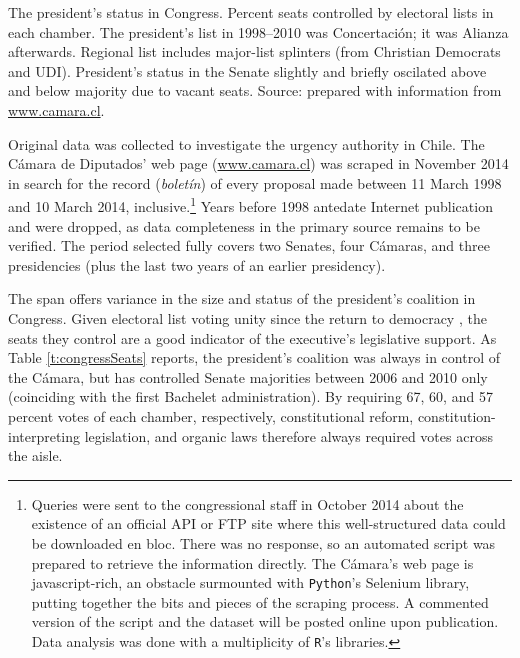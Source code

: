 \documentclass[letter,12pt]{article}
\newcommand{\mc}{\multicolumn}
\begin{document}
\begin{table}
\begin{center}
\caption{The president's status in Congress. Percent seats controlled by electoral lists in each chamber. The president's list in 1998--2010 was Concertaci\'on; it was Alianza afterwards. Regional list includes major-list splinters (from Christian Democrats and UDI). President's status in the Senate slightly and briefly oscilated above and below majority due to vacant seats. Source: prepared with information from \protect\url{www.camara.cl}.}\label{t:congressSeats}
\end{center}
\end{table}

Original data was collected to investigate the urgency authority in Chile. The C\'amara de Diputados' web page (\url{www.camara.cl}) was scraped in November 2014 in search for the record (\emph{bolet\'in}) of every proposal made between 11 March 1998 and 10 March 2014, inclusive.\footnote{Queries were sent to the congressional staff in October 2014 about the existence of an official API or FTP site where this well-structured data could be downloaded en bloc. There was no response, so an automated script was prepared to retrieve the information directly. The C\'amara's web page is javascript-rich, an obstacle surmounted with \texttt{Python}'s Selenium library, putting together the bits and pieces of the scraping process. A commented version of the script and the dataset will be posted online upon publication. Data analysis was done with a multiplicity of \texttt{R}'s libraries.} Years before 1998 antedate Internet publication and were dropped, as data completeness in the primary source remains to be verified. The period selected fully covers two Senates, four C\'amaras, and three presidencies (plus the last two years of an earlier presidency). 

The span offers variance in the size and status of the president's coalition in Congress. Given electoral list voting unity since the return to democracy \citep{carey.2002,aleman.saieg.coalUnityChile.2007}, the seats they control are a good indicator of the executive's legislative support. As Table \ref{t:congressSeats} reports, the president's coalition was always in control of the C\'amara, but has controlled Senate majorities between 2006 and 2010 only (coinciding with the first Bachelet administration). By requiring 67, 60, and 57 percent votes of each chamber, respectively, constitutional reform, constitution-interpreting legislation, and organic laws therefore always required votes across the aisle. 
\end{document}
